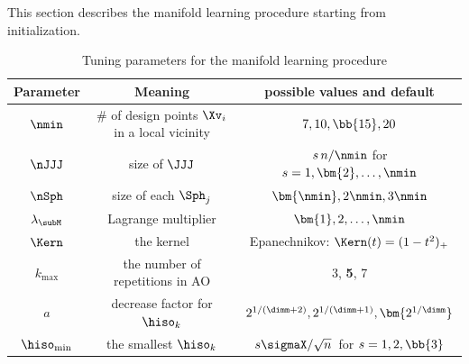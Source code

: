\label{SEDRmanproc}
This section describes the manifold learning procedure starting from initialization.




\begin{table}[h]
\begin{tabular}{c|c|c}
        \hline
        Parameter & Meaning & possible values and default \\
        \hline
        \( \nmin \) & \( \# \) of design points \( \Xv_{i} \) in a local vicinity & \( 7,{10}, \bb{15}, 20 \) \\
        \( \nJJJ \) & size of \( \JJJ \) 				& \( s \, n/\nmin \) for \( s=1,\bm{2},\ldots,\nmin \) \\
		\( \nSph \) & size of each \( \Sph_{j} \)		& \( \bm{\nmin}, 2\nmin, 3\nmin \) \\
		\( \lambda_{\subM} \) & Lagrange multiplier 		& \( \bm{1}, 2, \ldots, \nmin \) \\
		\( \Kern \) & the kernel & Epanechnikov: \( \Kern(t) = (1-t^{2})_{+} \) \\
		\( k_{\max} \) & the number of repetitions in AO & 3, \textbf{5}, 7 \\
		\( a \)	& decrease factor for \( \hiso_{k} \) & \( 2^{1/(\dimm+2)}, {2^{1/(\dimm+1)}}, \bm{2^{1/\dimm}} \) \\
		\( \hiso_{\min} \) & the smallest \( \hiso_{k} \) & \( s \sigmaX/\sqrt{n} \, \) for \( s=1,2,\bb{3} \) \\
		\hline
    \end{tabular}
\caption{Tuning parameters for the manifold learning procedure}    
\label{TdefML}
\end{table}


